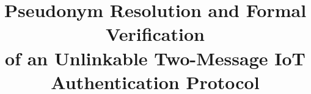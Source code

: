 \documentclass[conference]{IEEEtran}
\begin{document}
\title{Pseudonym Resolution and Formal Verification\\of an Unlinkable Two-Message IoT\\Authentication Protocol}

\maketitle

\end{document}
